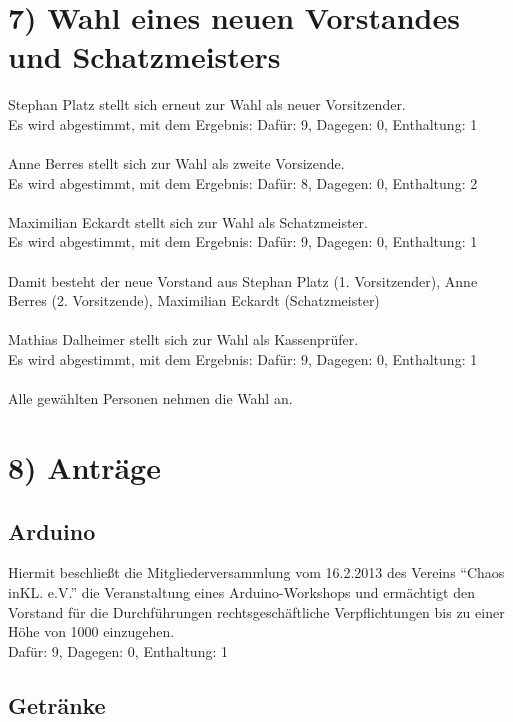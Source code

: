\documentclass{scrartcl}
\begin{document}
\section*{7) Wahl eines neuen Vorstandes und Schatzmeisters}
Stephan Platz stellt sich erneut zur Wahl als neuer Vorsitzender.\\
Es wird abgestimmt, mit dem Ergebnis: Dafür: 9, Dagegen: 0, Enthaltung: 1\\
\\
Anne Berres stellt sich zur Wahl als zweite Vorsizende.\\
Es wird abgestimmt, mit dem Ergebnis: Dafür: 8, Dagegen: 0, Enthaltung: 2\\
\\
Maximilian Eckardt stellt sich zur Wahl als Schatzmeister.\\
Es wird abgestimmt, mit dem Ergebnis: Dafür: 9, Dagegen: 0, Enthaltung: 1\\
\\
Damit besteht der neue Vorstand aus Stephan Platz (1. Vorsitzender), Anne Berres (2. Vorsitzende), Maximilian Eckardt (Schatzmeister)\\
\\
Mathias Dalheimer stellt sich zur Wahl als Kassenprüfer.\\
Es wird abgestimmt, mit dem Ergebnis: Dafür: 9, Dagegen: 0, Enthaltung: 1\\
\\
Alle gewählten Personen nehmen die Wahl an.\\

\section*{8) Anträge}
\subsection*{Arduino}

Hiermit beschließt die Mitgliederversammlung vom 16.2.2013 des
Vereins ``Chaos inKL. e.V.'' die Veranstaltung eines Arduino-Workshops
und ermächtigt den Vorstand für die Durchführungen
rechtsgeschäftliche Verpflichtungen bis zu einer Höhe von 1000\officialeuro\,\,einzugehen.\\

Dafür: 9, Dagegen: 0, Enthaltung: 1

\subsection*{Getränke}
\end{document}
